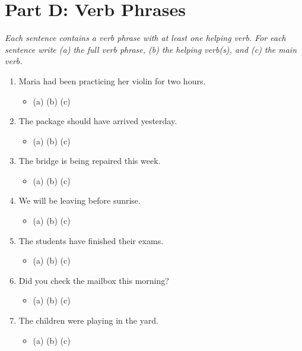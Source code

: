 \documentclass[11pt]{article}
\newcommand{\ansline}{\underline{\hspace{1.1in}}}
\begin{document}
\section*{Part D: Verb Phrases}
\noindent\textit{Each sentence contains a verb phrase with at least one helping verb. For each sentence write (a) the full verb phrase, (b) the helping verb(s), and (c) the main verb.}
\begin{enumerate}
  \item Maria had been practicing her violin for two hours.
  \begin{itemize}\setlength\itemsep{0pt}
    \item (a) \ansline \quad (b) \ansline \quad (c) \ansline
  \end{itemize}
  \item The package should have arrived yesterday.
  \begin{itemize}\setlength\itemsep{0pt}
    \item (a) \ansline \quad (b) \ansline \quad (c) \ansline
  \end{itemize}
  \item The bridge is being repaired this week.
  \begin{itemize}\setlength\itemsep{0pt}
    \item (a) \ansline \quad (b) \ansline \quad (c) \ansline
  \end{itemize}
  \item We will be leaving before sunrise.
  \begin{itemize}\setlength\itemsep{0pt}
    \item (a) \ansline \quad (b) \ansline \quad (c) \ansline
  \end{itemize}
  \item The students have finished their exams.
  \begin{itemize}\setlength\itemsep{0pt}
    \item (a) \ansline \quad (b) \ansline \quad (c) \ansline
  \end{itemize}
  \item Did you check the mailbox this morning?
  \begin{itemize}\setlength\itemsep{0pt}
    \item (a) \ansline \quad (b) \ansline \quad (c) \ansline
  \end{itemize}
  \item The children were playing in the yard.
  \begin{itemize}\setlength\itemsep{0pt}
    \item (a) \ansline \quad (b) \ansline \quad (c) \ansline

\end{itemize}
\end{enumerate}
\end{document}
